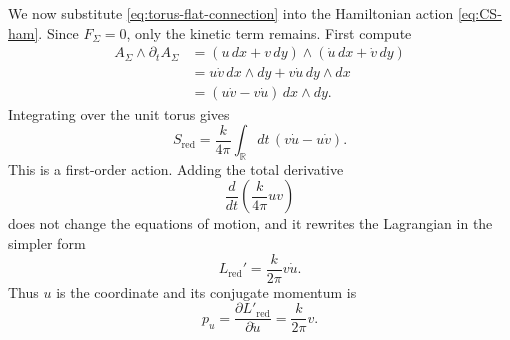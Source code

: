 \documentclass[11pt]{article}
\newcommand{\R}{\mathbb{R}}
\theoremstyle{definition}
\numberwithin{theorem}{section}
\numberwithin{equation}{section}
\let\del\partial
\begin{document}
\medskip

\noindent We now substitute \eqref{eq:torus-flat-connection} into the Hamiltonian action \eqref{eq:CS-ham}. Since $F_\Sigma=0$, only the kinetic term remains. First compute
\begin{align*}
A_\Sigma\wedge \del_t A_\Sigma
&=
(u\,dx + v\,dy)\wedge(\dot u\,dx + \dot v\,dy) \\
&=
u\dot v\, dx\wedge dy + v\dot u\, dy\wedge dx \\
&=
(u\dot v - v\dot u)\,dx\wedge dy.
\end{align*}
Integrating over the unit torus gives
\begin{equation}\label{eq:reduced-action-first}
S_{\mathrm{red}}
=
\frac{k}{4\pi}\int_\R dt\,(v\dot u - u\dot v).
\end{equation}
This is a first-order action. Adding the total derivative
\begin{equation*}
\frac{d}{dt}\left(\frac{k}{4\pi}uv\right)
\end{equation*}
does not change the equations of motion, and it rewrites the Lagrangian in the simpler form
\begin{equation}\label{eq:reduced-action-canonical}
L_{\mathrm{red}}' = \frac{k}{2\pi}v\dot u.
\end{equation}
Thus $u$ is the coordinate and its conjugate momentum is
\begin{equation}\label{eq:canonical-momentum}
p_u = \frac{\del L'_{\mathrm{red}}}{\del \dot u} = \frac{k}{2\pi}v.
\end{equation}

\medskip
\end{document}
